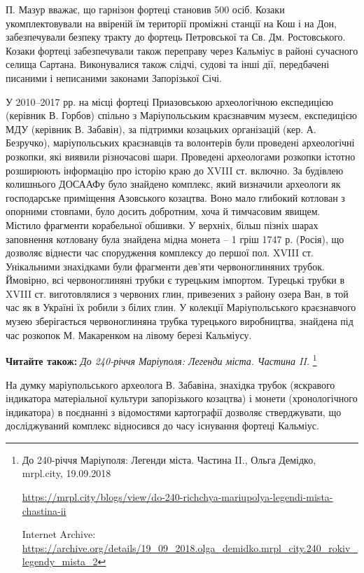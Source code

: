 П. Мазур вважає, що гарнізон фортеці становив 500 осіб. Козаки укомплектовували
на ввіреній їм території проміжні станції на Кош і на Дон, забезпечували
безпеку тракту до фортець Петровської та Св. Дм. Ростовського. Козаки фортеці
забезпечували також переправу через Кальміус в районі сучасного селища Сартана.
Виконувалися також слідчі, судові та інші дії, передбачені писаними і
неписаними законами Запорізької Січі.

У 2010–2017 рр. на місці фортеці Приазовською археологічною експедицією
(керівник В. Горбов) спільно з Маріупольським краєзнавчим музеєм, експедицією
МДУ (керівник В. Забавін), за підтримки козацьких організацій (кер. А.
Безручко), маріупольських краєзнавців та волонтерів були проведені археологічні
розкопки, які виявили різночасові шари. Проведені археологами розкопки істотно
розширюють інформацію про історію краю до XVIII ст. включно. За будівлею
колишнього ДОСААФу було знайдено комплекс, який визначили археологи як
господарське приміщення Азовського козацтва. Воно мало глибокий котлован з
опорними стовпами, було досить добротним, хоча й тимчасовим явищем. Містило
фрагменти корабельної обшивки. У верхніх, більш пізніх шарах заповнення
котловану була знайдена мідна монета – 1 гріш 1747 р. (Росія), що дозволяє
віднести час спорудження комплексу до першої пол. XVIII ст. Унікальними
знахідками були фрагменти дев'яти червоноглиняних трубок. Ймовірно, всі
червоноглиняні трубки є турецьким імпортом. Турецькі трубки в XVIII ст.
виготовлялися з червоних глин, привезених з району озера Ван, в той час як в
Україні їх робили з білих глин. У колекції Маріупольського краєзнавчого музею
зберігається червоноглиняна трубка турецького виробництва, знайдена під час
розкопок М. Макаренком на лівому березі Кальміусу.

\textbf{Читайте також:} \emph{До 240-річчя Маріуполя: Легенди міста. Частина II.}%
\footnote{До 240-річчя Маріуполя: Легенди міста. Частина II., Ольга Демідко, mrpl.city, 19.09.2018 \par
\url{https://mrpl.city/blogs/view/do-240-richchya-mariupolya-legendi-mista-chastina-ii}\par
Internet Archive: \url{https://archive.org/details/19_09_2018.olga_demidko.mrpl_city.240_rokiv_legendy_mista_2}
}

На думку маріупольського археолога В. Забавіна, знахідка трубок (яскравого
індикатора матеріальної культури запорізького козацтва) і монети
(хронологічного індикатора) в поєднанні з відомостями картографії дозволяє
стверджувати, що досліджуваний комплекс відносився до часу існування фортеці
Кальміус.

